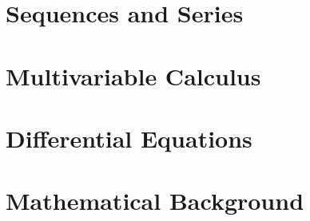 \documentclass[11pt]{book}
\begin{document}
\part{Sequences and Series}





\part{Multivariable Calculus}





\part{Differential Equations}





\part{Mathematical Background}


\end{document}
